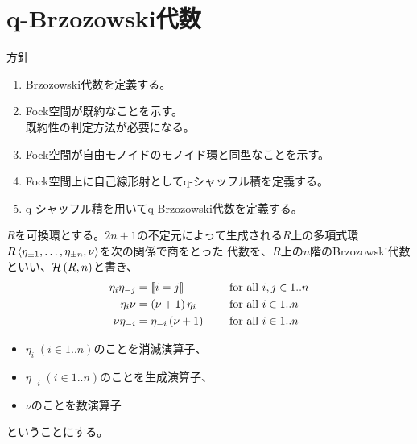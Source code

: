 {\section{q-Brzozowski代数}\label{s1:q-Brzozowski代数} %
	方針
	\begin{enumerate}\setlength{\itemsep}{-1mm} %
		\item Brzozowski代数を定義する。
		\item Fock空間が既約なことを示す。\\
		既約性の判定方法が必要になる。
		\item Fock空間が自由モノイドのモノイド環と同型なことを示す。
		\item Fock空間上に自己線形射としてq-シャッフル積を定義する。
		\item q-シャッフル積を用いてq-Brzozowski代数を定義する。
	\end{enumerate} %
	\begin{definition}[Brzozowski代数]\label{def:Brzozowski代数} %
		$R$を可換環とする。$2n+1$の不定元によって生成される$R$上の多項式環
		$R\mathinner{\langle{\eta_{\pm1},\dots,\eta_{\pm n},\nu}\rangle}$を次の関係で商をとった
		代数を、$R$上の$n$階のBrzozowski代数といい、${{\mathcal{H}}}\mathinner{\left({R,n}\right)}$と書き、
		\begin{alignat*}{2}
			\eta_i\eta_{-j} &= \mathinner{[\![i=j]\!]} &\quad&\text{ for all } i,j\in1..n \\
			\eta_i\nu &= \mathinner{\left({\nu + 1}\right)}\eta_i &\quad&\text{ for all } i\in1..n \\
			\nu\eta_{-i} &= \eta_{-i}\mathinner{\left({\nu + 1}\right)} 
				&\quad&\text{ for all } i\in1..n
		\end{alignat*}
		\begin{itemize}\setlength{\itemsep}{-1mm} %
			\item $\eta_i\;(i\in1..n)$のことを消滅演算子、
			\item $\eta_{-i}\;(i\in1..n)$のことを生成演算子、
			\item $\nu$のことを数演算子
		\end{itemize} %
		ということにする。
	\end{definition} %

}
